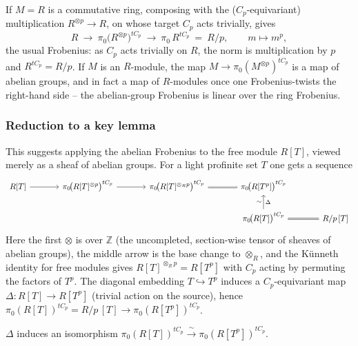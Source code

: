 If $M=R$ is a commutative ring, composing with the ($C_p$-equivariant)
multiplication $R^{\otimes p}\to R$, on whose target $C_p$ acts trivially, gives
\begin{equation*}
R\ \longrightarrow\ \pi_0\big(R^{\otimes p}\big)^{tC_p}\ \longrightarrow\ \pi_0\, R^{tC_p}\ =\ R/p,\qquad m\longmapsto m^p,
\end{equation*}
the usual Frobenius: as $C_p$ acts trivially on $R$, the norm is multiplication
by $p$ and $R^{tC_p}=R/p$. If $M$ is an $R$-module, the map $M\to\pi_0(M^{\otimes p})^{tC_p}$ is a
map of abelian groups, and in fact a map of $R$-modules once one Frobenius-twists
the right-hand side -- the abelian-group Frobenius is linear over the ring
Frobenius.

\subsubsection*{Reduction to a key lemma}

This suggests applying the abelian Frobenius to the free module $R[T]$, viewed
merely as a sheaf of abelian groups. For a light profinite set $T$ one gets a
sequence
\begin{equation}
\label{eq:13:frobenius-RT}
\begin{tikzcd}[column sep=large]
R[T] \arrow[r] & \pi_0\!\big(R[T]^{\otimes p}\big)^{tC_p} \arrow[r] & \pi_0\!\big(R[T]^{\otimes_R p}\big)^{tC_p} \arrow[r, equal] & \pi_0\!\big(R[T^p]\big)^{tC_p} \\
& & & \pi_0\!\big(R[T]\big)^{tC_p} \arrow[u, "\Delta"', "\sim"] \arrow[r, equal] & R/p\,[T]
\end{tikzcd}
\end{equation}
Here the first $\otimes$ is over $\mathbb Z$ (the uncompleted, section-wise tensor
of sheaves of abelian groups), the middle arrow is the base change to
$\otimes_R$, and the K\"unneth identity for free modules gives
$R[T]^{\otimes_R p}=R[T^p]$ with $C_p$ acting by permuting the factors of $T^p$.
The diagonal embedding $T\hookrightarrow T^p$ induces a $C_p$-equivariant map
$\Delta\colon R[T]\to R[T^p]$ (trivial action on the source), hence
$\pi_0(R[T])^{tC_p}=R/p\,[T]\to\pi_0(R[T^p])^{tC_p}$.

\begin{claim}
\label{claim:13:delta-iso}
$\Delta$ induces an isomorphism $\pi_0(R[T])^{tC_p}\xrightarrow{\ \sim\ }\pi_0(R[T^p])^{tC_p}$.
\end{claim}

